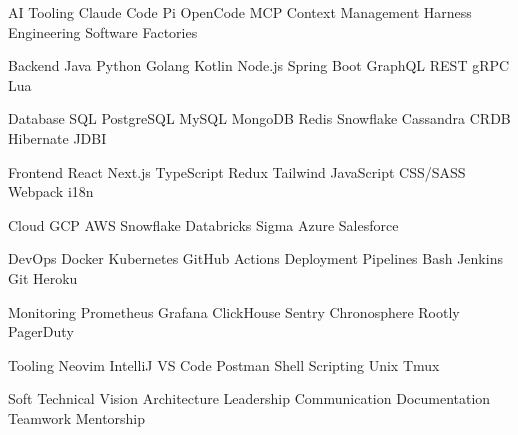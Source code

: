 

\begin{cvskills}

  \cvskill
    {AI Tooling} %
    {Claude Code \cpshalf Pi \cpshalf OpenCode \cpshalf MCP \cpshalf Context Management \cpshalf Harness Engineering \cpshalf Software Factories} %

  \cvskill
    {Backend} %
    {Java \cpshalf Python \cpshalf Golang \cpshalf Kotlin \cpshalf Node.js \cpshalf Spring Boot \cpshalf GraphQL \cpshalf REST \cpshalf gRPC \cpshalf Lua } %

  \cvskill
    {Database} %
    {SQL \cpshalf PostgreSQL \cpshalf MySQL \cpshalf MongoDB \cpshalf Redis \cpshalf Snowflake \cpshalf Cassandra \cpshalf CRDB \cpshalf Hibernate \cpshalf JDBI} %

  \cvskill
    {Frontend} %
    {React \cpshalf Next.js \cpshalf TypeScript \cpshalf Redux \cpshalf Tailwind \cpshalf JavaScript \cpshalf CSS/SASS \cpshalf Webpack \cpshalf i18n} %

  \cvskill
    {Cloud} %
    {GCP \cpshalf AWS \cpshalf Snowflake \cpshalf Databricks \cpshalf Sigma \cpshalf Azure \cpshalf Salesforce} %

  \cvskill
    {DevOps} %
    {Docker \cpshalf Kubernetes \cpshalf GitHub Actions \cpshalf Deployment Pipelines \cpshalf Bash \cpshalf Jenkins \cpshalf Git \cpshalf Heroku} %


  \cvskill
  {Monitoring} %
    {Prometheus \cpshalf Grafana \cpshalf ClickHouse \cpshalf Sentry \cpshalf Chronosphere \cpshalf Rootly \cpshalf PagerDuty} %

  \cvskill
  {Tooling} %
    {Neovim \cpshalf IntelliJ \cpshalf VS Code \cpshalf Postman \cpshalf Shell Scripting \cpshalf Unix \cpshalf Tmux} %

  \cvskill
  {Soft} %
    {Technical Vision \cpshalf Architecture \cpshalf Leadership \cpshalf Communication \cpshalf Documentation \cpshalf Teamwork \cpshalf Mentorship} %

\end{cvskills}
